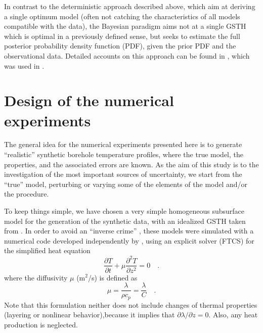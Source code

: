 \documentclass[cp]{copernicus}
\begin{document}
In contrast to the deterministic approach described above, which aim at deriving a single optimum 
model (often not catching the characteristics of all models compatible with the data), the Bayesian 
paradigm \cite[see, e.g.][] {Gelman2013a} aims not at a single GSTH which is optimal in a 
previously defined sense, but seeks to estimate the full posterior probability density function 
(PDF), given the prior PDF and the observational data. Detailed accounts on this approach can be 
found in \citep{Mosegaard1995a, Mosegaard2002a, Tarantola2005a}, which was used in \cite[] [amongst 
others] {Kukkonen2011a, Kukkonen2011b, Kukkonen2015a, Rath2019a}. 


\section{Design of the numerical experiments}
\label{sec:design}

The general idea for the numerical experiments presented here is to generate ``realistic'' synthetic 
borehole temperature profiles, where the true model, the  properties, and the associated errors are 
known. As the aim of this study is to the investigation of the most important sources of 
uncertainty, we start from the ``true'' model, perturbing or varying some of the elements  of the 
model and/or the procedure.   

To keep things simple, we have chosen a very simple homogeneous subsurface model for the generation 
of the synthetic data, with an idealized  GSTH taken from \cite{Balling1981a}. In order to avoid an 
``inverse crime'' \cite[see] [] {Kaipio2005a}, these models were simulated with a numerical code 
developed independently by \citet{Heckenbach2019a}, using an explicit solver (FTCS) for the 
simplified heat equation
\begin{equation}\label{eqn:heat}
\frac{\partial T}{\partial t} + \mu \frac{\partial^2 T}{\partial z^2} = 0 \quad .
\end{equation}
\noindent where the diffusivity $\mu$ (m$^2$/s) is defined as  
\begin{equation}\label{eqn:diff}
\mu = \frac{\lambda}{\rho c_p} = \frac{\lambda}{C} \quad .
\end{equation} 
\noindent Note that this formulation neither does not include changes of thermal properties 
(layering or nonlinear behavior),because it implies that $\partial \lambda/\partial z = 0$. Also, 
any heat production is neglected. 
\end{document}
